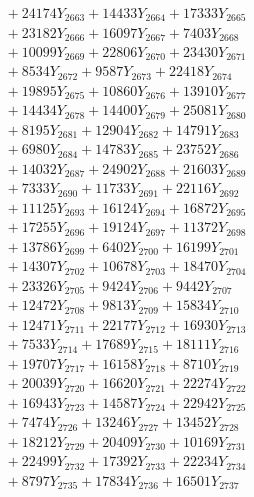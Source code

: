 \documentclass[a4paper,10pt]{article}
\begin{document}
{\begin{align}
&\;  + 24174 Y_{2663} + 14433 Y_{2664} + 17333 Y_{2665} \\[0.3ex]
&\;  + 23182 Y_{2666} + 16097 Y_{2667} + 7403 Y_{2668} \\[0.5ex]\allowbreak
&\;  + 10099 Y_{2669} + 22806 Y_{2670} + 23430 Y_{2671} \\[0.3ex]
&\;  + 8534 Y_{2672} + 9587 Y_{2673} + 22418 Y_{2674} \\[0.3ex]
&\;  + 19895 Y_{2675} + 10860 Y_{2676} + 13910 Y_{2677} \\[0.3ex]
&\;  + 14434 Y_{2678} + 14400 Y_{2679} + 25081 Y_{2680} \\[0.3ex]
&\;  + 8195 Y_{2681} + 12904 Y_{2682} + 14791 Y_{2683} \\[0.3ex]
&\;  + 6980 Y_{2684} + 14783 Y_{2685} + 23752 Y_{2686} \\[0.3ex]
&\;  + 14032 Y_{2687} + 24902 Y_{2688} + 21603 Y_{2689} \\[0.3ex]
&\;  + 7333 Y_{2690} + 11733 Y_{2691} + 22116 Y_{2692} \\[0.3ex]
&\;  + 11125 Y_{2693} + 16124 Y_{2694} + 16872 Y_{2695} \\[0.3ex]
&\;  + 17255 Y_{2696} + 19124 Y_{2697} + 11372 Y_{2698} \\[0.5ex]\allowbreak
&\;  + 13786 Y_{2699} + 6402 Y_{2700} + 16199 Y_{2701} \\[0.3ex]
&\;  + 14307 Y_{2702} + 10678 Y_{2703} + 18470 Y_{2704} \\[0.3ex]
&\;  + 23326 Y_{2705} + 9424 Y_{2706} + 9442 Y_{2707} \\[0.3ex]
&\;  + 12472 Y_{2708} + 9813 Y_{2709} + 15834 Y_{2710} \\[0.3ex]
&\;  + 12471 Y_{2711} + 22177 Y_{2712} + 16930 Y_{2713} \\[0.3ex]
&\;  + 7533 Y_{2714} + 17689 Y_{2715} + 18111 Y_{2716} \\[0.3ex]
&\;  + 19707 Y_{2717} + 16158 Y_{2718} + 8710 Y_{2719} \\[0.3ex]
&\;  + 20039 Y_{2720} + 16620 Y_{2721} + 22274 Y_{2722} \\[0.3ex]
&\;  + 16943 Y_{2723} + 14587 Y_{2724} + 22942 Y_{2725} \\[0.3ex]
&\;  + 7474 Y_{2726} + 13246 Y_{2727} + 13452 Y_{2728} \\[0.5ex]\allowbreak
&\;  + 18212 Y_{2729} + 20409 Y_{2730} + 10169 Y_{2731} \\[0.3ex]
&\;  + 22499 Y_{2732} + 17392 Y_{2733} + 22234 Y_{2734} \\[0.3ex]
&\;  + 8797 Y_{2735} + 17834 Y_{2736} + 16501 Y_{2737} \\[0.3ex]

\end{align}}
\end{document}
